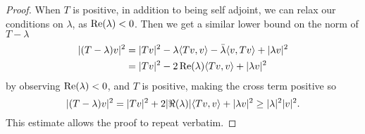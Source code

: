\documentclass[11pt]{amsart}
\begin{document}
\begin{proof}
		When $T$ is positive, in addition to being self adjoint, we can relax our conditions on $\lambda$, as $\operatorname{Re}(\lambda) < 0$. Then we get a similar lower bound on the norm of $T-\lambda$
			\begin{equation*}
			\begin{split}
				|(T-\lambda)v|^2 & =|Tv|^2-\lambda \langle Tv, v \rangle-\bar{\lambda} \langle v, Tv \rangle+|\lambda v|^2 \\
							  & =|Tv|^2 -2 \operatorname{Re}(\lambda) \langle Tv, v \rangle +|\lambda v|^2
			\end{split}
			\end{equation*}
		by observing $\operatorname{Re}(\lambda) < 0$, and $T$ is positive, making the cross term positive so 
			\begin{equation*}
				|(T-\lambda)v|^2=|Tv|^2 +2 |\Re(\lambda)| \langle Tv, v \rangle +|\lambda v|^2 \geq |\lambda|^2 |v|^2.
			\end{equation*}
		This estimate allows the proof to repeat verbatim.
	\end{proof}
	
\end{document}
